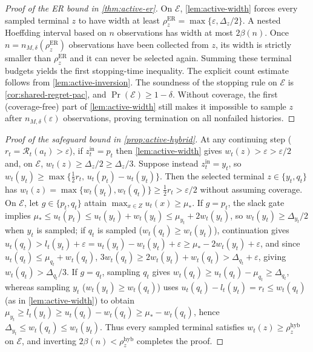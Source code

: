 \documentclass{article}
\theoremstyle{plain}
\theoremstyle{definition}
\begin{document}
\begin{proof}[Proof of the ER bound in \cref{thm:active-er}]
On $\mathcal E$, \cref{lem:active-width} forces every sampled terminal $z$ to have width at least $\rho_z^{\mathrm{ER}}=\max\{\varepsilon,\Delta_z/2\}$. A nested Hoeffding interval based on $n$ observations has width at most $2\beta(n)$. Once $n=n_{M,\delta}(\rho_z^{\mathrm{ER}})$ observations have been collected from $z$, its width is strictly smaller than $\rho_z^{\mathrm{ER}}$ and it can never be selected again. Summing these terminal budgets yields the first stopping-time inequality. The explicit count estimate follows from \cref{lem:active-inversion}. The soundness of the stopping rule on $\mathcal E$ is \cref{cor:shared-regret-pac}, and $\Pr(\mathcal E)\ge1-\delta$. Without coverage, the first (coverage-free) part of \cref{lem:active-width} still makes it impossible to sample $z$ after $n_{M,\delta}(\varepsilon)$ observations, proving termination on all nonfailed histories.
\end{proof}

\begin{proof}[Proof of the safeguard bound in \cref{prop:active-hybrid}]
At any continuing step ($r_t=\mathcal R_t(a_t)>\varepsilon$), if $z_t^{\mathrm{in}}=p_t$ then \cref{lem:active-width} gives $w_t(z)>\varepsilon>\varepsilon/2$ and, on $\mathcal E$, $w_t(z)\ge\Delta_z/2\ge\Delta_z/3$. Suppose instead $z_t^{\mathrm{in}}=y_t$, so $w_t(y_t)\ge\max\{\tfrac12 r_t,\,u_t(p_t)-u_t(y_t)\}$. Then the selected terminal $z\in\{y_t,q_t\}$ has $w_t(z)=\max\{w_t(y_t),w_t(q_t)\}\ge\tfrac12 r_t>\varepsilon/2$ without assuming coverage. On $\mathcal E$, let $g\in\{p_t,q_t\}$ attain $\max_{x\in Z}u_t(x)\ge\mu_*$. If $g=p_t$, the slack gate implies $\mu_*\le u_t(p_t)\le u_t(y_t)+w_t(y_t)\le\mu_{y_t}+2w_t(y_t)$, so $w_t(y_t)\ge\Delta_{y_t}/2$ when $y_t$ is sampled; if $q_t$ is sampled ($w_t(q_t)\ge w_t(y_t)$), continuation gives $u_t(q_t)>l_t(y_t)+\varepsilon=u_t(y_t)-w_t(y_t)+\varepsilon\ge\mu_*-2w_t(y_t)+\varepsilon$, and since $u_t(q_t)\le\mu_{q_t}+w_t(q_t)$, $3w_t(q_t)\ge 2w_t(y_t)+w_t(q_t)>\Delta_{q_t}+\varepsilon$, giving $w_t(q_t)>\Delta_{q_t}/3$. If $g=q_t$, sampling $q_t$ gives $w_t(q_t)\ge u_t(q_t)-\mu_{q_t}\ge\Delta_{q_t}$, whereas sampling $y_t$ ($w_t(y_t)\ge w_t(q_t)$) uses $u_t(q_t)-l_t(y_t)=r_t\le w_t(q_t)$ (as in \cref{lem:active-width}) to obtain $\mu_{y_t}\ge l_t(y_t)\ge u_t(q_t)-w_t(q_t)\ge\mu_*-w_t(q_t)$, hence $\Delta_{y_t}\le w_t(q_t)\le w_t(y_t)$. Thus every sampled terminal satisfies $w_t(z)\ge\rho_z^{\mathrm{hyb}}$ on $\mathcal E$, and inverting $2\beta(n)<\rho_z^{\mathrm{hyb}}$ completes the proof.
\end{proof}
\end{document}
